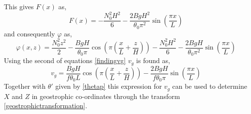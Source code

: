This gives $F(x)$ as,
\begin{equation*}
	F(x) = -\frac{N_0^2H^2}{6} - \frac{2BgH^2}{\theta_0\pi^2}\sin\left(\frac{\pi x}{L}\right)
\end{equation*}
and consequently $\varphi$ as,
\begin{equation}
	\varphi(x,z) = \frac{N_0^2z^2}{2} - \frac{BgH}{\theta_0\pi}\cos\left(\pi\left(\frac{x}{L}+\frac{z}{H}\right)\right)-\frac{N_0^2H^2}{6} - \frac{2BgH}{\theta_0\pi^2}\sin\left(\frac{\pi x}{L}\right)
\end{equation}
Using the second of equations \ref{findingvg} $v_g$ is found as,
\begin{equation}
	v_g = \frac{BgH}{f\theta_0L}\cos\left(\pi\left(\frac{x}{L}+\frac{z}{H}\right)\right)- \frac{2BgH}{f\theta_0\pi}\sin\left(\frac{\pi x}{L}\right)
\end{equation}
Together with $\theta'$ given by \ref{thetap} this expression for $v_g$ can be used to determine $X$ and $Z$ in geostrophic co-ordinates through the transform \ref{geostrophictransformation}.
